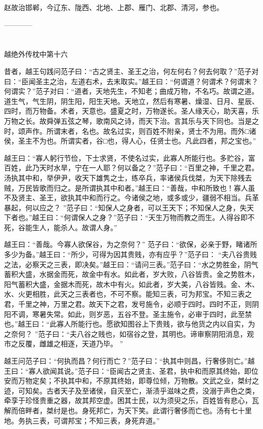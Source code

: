 \documentclass[12pt,UTF8]{ctexbook}
\begin{document}
赵故治邯郸，今辽东、陇西、北地、上郡、雁门、北郡、清河，参也。


------------

\part{}

越绝外传枕中第十六

昔者，越王句践问范子曰：“古之贤主、圣王之治，何左何右？何去何取？”范子对曰：“臣闻圣主之治，左道右术，去末取实。”越王曰：“何谓道？何谓术？何谓末？何谓实？”范子对曰：“道者，天地先生，不知老；曲成万物，不名巧。故谓之道。道生气，气生阴，阴生阳，阳生天地。天地立，然后有寒暑、燥湿、日月、星辰、四时，而万物备。术者，天意也。盛夏之时，万物遂长。圣人缘天心，助天喜，乐万物之长。故舜弹五弦之琴，歌南风之诗，而天下治。言其乐与天下同也。当是之时，颂声作。所谓末者，名也。故名过实，则百姓不附亲，贤士不为用。而外□诸侯，圣主不为也。所谓实者，谷□也，得人心，任贤士也。凡此四者，邦之宝也。”

越王曰：“寡人躬行节俭，下士求贤，不使名过实，此寡人所能行也。多贮谷，富百姓，此乃天时水旱，宁在一人耶？何以备之？”范子曰：“百里之神，千里之君。汤执其中和，举伊尹，收天下雄隽之士，练卒兵，率诸侯兵伐桀，为天下除残去贼，万民皆歌而归之。是所谓执其中和者。”越王曰：“善哉，中和所致也！寡人虽不及贤主、圣王，欲执其中和而行之。今诸侯之地，或多或少，疆弱不相当。兵革暴起，何以应之？ ”范子曰：“知保人之身者，可以王天下；不知保人之身，失天下者也。”越王曰：“何谓保人之身？”范子曰：“天生万物而教之而生。人得谷即不死，谷能生人，能杀人。故谓人身。”

越王曰：“善哉。今寡人欲保谷，为之奈何？” 范子曰：“欲保，必亲于野，睹诸所多少为备。”越王曰：“所少，可得为因其贵贱，亦有应乎？”范子曰： “夫八谷贵贱之法，必察天之三表，即决矣。”越王曰：“请问三表。”范子曰：“水之势胜金，阴气蓄积大盛，水据金而死，故金中有水。如此者，岁大败，八谷皆贵。金之势胜木，阳气蓄积大盛，金据木而死，故木中有火。如此者，岁大美，八谷皆贱。金、木、水、火更相胜，此天之三表者也，不可不察。能知三表，可为邦宝。不知三表之君，千里之神，万里之君。故天下之君，发号施令，必顺于四时。四时不正，则阴阳不调，寒暑失常。如此，则岁恶，五谷不登。圣主施令，必审于四时，此至禁也。”越王曰：“此寡人所能行也。愿欲知图谷上下贵贱，欲与他货之内以自实，为之奈何？ ”范子曰：“夫八谷之贱也，如宿谷之登，其明也。谛审察阴阳消息，观市之反覆，雌雄之相逐，天道乃毕。 ”

越王问范子曰：“何执而昌？何行而亡？”范子曰：“执其中则昌，行奢侈则亡。”越王曰：“寡人欲闻其说。”范子曰：“臣闻古之贤主、圣君，执中和而原其终始，即位安而万物定矣；不执其中和，不原其终始，即尊位倾，万物散。文武之业，桀纣之迹，可知矣。古者天子及至诸侯，自灭至亡，渐渍乎滋味之费，没溺于声色之类，牵孪于珍怪贵重之器，故其邦空虚。困其士民，以为须臾之乐，百姓皆有悲心，瓦解而倍畔者，桀纣是也。身死邦亡，为天下笑。此谓行奢侈而亡也。汤有七十里地。务执三表，可谓邦宝；不知三表，身死弃道。”
\end{document}
